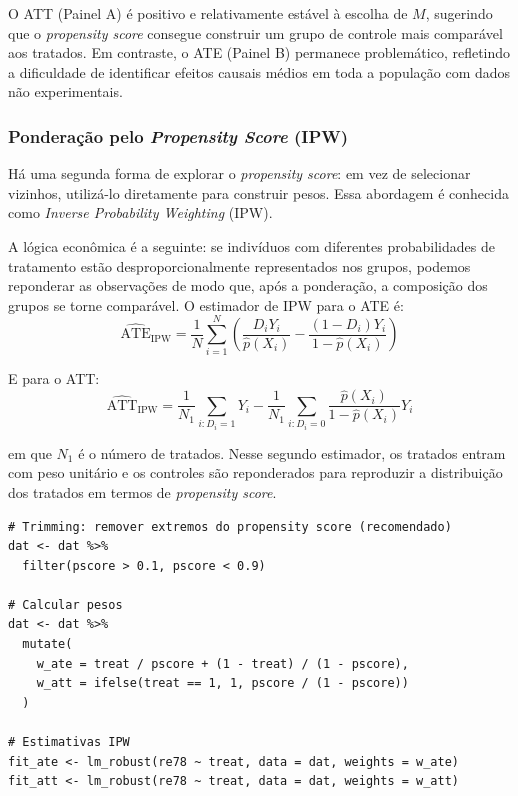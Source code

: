 \documentclass[12pt,a4paper]{article}
\begin{document}
O ATT (Painel A) é positivo e relativamente estável à escolha de $M$, sugerindo que o \textit{propensity score} consegue construir um grupo de controle mais comparável aos tratados. Em contraste, o ATE (Painel B) permanece problemático, refletindo a dificuldade de identificar efeitos causais médios em toda a população com dados não experimentais.

\subsubsection{Ponderação pelo \textit{Propensity Score} (IPW)}

Há uma segunda forma de explorar o \textit{propensity score}: em vez de selecionar vizinhos, utilizá-lo diretamente para construir pesos. Essa abordagem é conhecida como \textit{Inverse Probability Weighting} (IPW).

A lógica econômica é a seguinte: se indivíduos com diferentes probabilidades de tratamento estão desproporcionalmente representados nos grupos, podemos reponderar as observações de modo que, após a ponderação, a composição dos grupos se torne comparável. O estimador de IPW para o ATE é:
$$\widehat{\text{ATE}}_{\text{IPW}} = \frac{1}{N}\sum_{i=1}^N\left(\frac{D_i Y_i}{\hat{p}(X_i)} - \frac{(1-D_i)Y_i}{1-\hat{p}(X_i)}\right)$$

E para o ATT:
$$\widehat{\text{ATT}}_{\text{IPW}} = \frac{1}{N_1}\sum_{i:D_i=1} Y_i - \frac{1}{N_1}\sum_{i:D_i=0} \frac{\hat{p}(X_i)}{1-\hat{p}(X_i)} Y_i$$

em que $N_1$ é o número de tratados. Nesse segundo estimador, os tratados entram com peso unitário e os controles são reponderados para reproduzir a distribuição dos tratados em termos de \textit{propensity score}.

\begin{lstlisting}[style=Rstyle]
# Trimming: remover extremos do propensity score (recomendado)
dat <- dat %>%
  filter(pscore > 0.1, pscore < 0.9)

# Calcular pesos
dat <- dat %>%
  mutate(
    w_ate = treat / pscore + (1 - treat) / (1 - pscore),
    w_att = ifelse(treat == 1, 1, pscore / (1 - pscore))
  )

# Estimativas IPW
fit_ate <- lm_robust(re78 ~ treat, data = dat, weights = w_ate)
fit_att <- lm_robust(re78 ~ treat, data = dat, weights = w_att)
\end{lstlisting}
\end{document}
